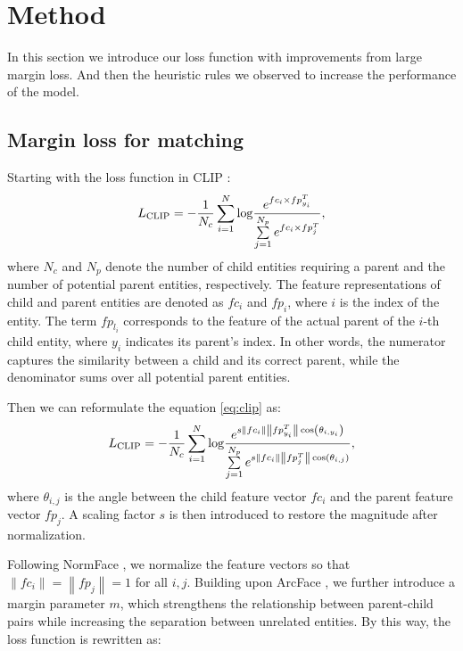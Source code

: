 \section{Method}
In this section we introduce our loss function with improvements from large margin loss. And then the heuristic rules we observed to increase the performance of the model.
\label{sec:method}
\subsection{Margin loss for matching}
Starting with the loss function in CLIP \cite{radford2021learning}:
\begin{equation}
\label{eq:clip}
\small
    L_{\text{CLIP}}=-\frac{1}{N_c}\sum\limits_{i=1}^{N}{\log }\frac{ e^{ fc_{i} \times  fp_{y_i}^{T} }}{\sum\limits_{j=1}^{N_p}{{e}^{fc_{i} \times fp_{j}^{T} }}},
\end{equation}
where \( N_c \) and \( N_p \) denote the number of child entities requiring a parent and the number of potential parent entities, respectively. The feature representations of child and parent entities are denoted as \( fc_i \) and \( fp_i \), where \( i \) is the index of the entity. The term \( fp_{l_i} \) corresponds to the feature of the actual parent of the \( i \)-th child entity, where \( y_i \) indicates its parent’s index. In other words, the numerator captures the similarity between a child and its correct parent, while the denominator sums over all potential parent entities.

Then we can reformulate the equation \ref{eq:clip} as:
\begin{equation}
\label{eq:clip2}
\small
    L_{\text{CLIP}}=-\frac{1}{N_c}\sum\limits_{i=1}^{N}{\log }\frac{ e^{ 
 s\left\|fc_{i}\right\| \left\|fp_{y_i}^{T}\right\|  \cos\left( \theta_{i,y_i} \right) }}{\sum\limits_{j=1}^{N_p}{{e}^{ s\left\|fc_{i}\right\|\left\|fp_{j}^{T}\right\| \cos\left( \theta_{i,j} \right) }}},
\end{equation}
where $\theta_{i,j}$ is the angle between the child feature vector $fc_{i}$ and the parent feature vector $fp_{j}$. A scaling factor \( s \) is then introduced to restore the magnitude after normalization.

Following NormFace \cite{wang2017normface}, we normalize the feature vectors so that \( \left\|fc_{i}\right\|=\left\|fp_{j}\right\|=1 \) for all \( i, j \). Building upon ArcFace \cite{deng2019arcface}, we further introduce a margin parameter \( m \), which strengthens the relationship between parent-child pairs while increasing the separation between unrelated entities. By this way, the loss function is rewritten as:

